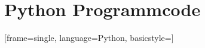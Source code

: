 
\appendix
\section{Python Programmcode}
[frame=single, language=Python, basicstyle=\fontsize{8}{13}\selectfont\ttfamily]